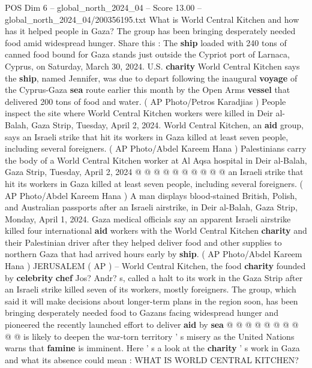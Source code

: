 \begin{textsample}{POS Dim 6 – global\_north\_2024\_04 – Score 13.00 – global\_north\_2024\_04/200356195.txt}  \label{ex:f6_pos_072}
What is World Central Kitchen and how has it helped people in Gaza?
The group has been bringing desperately needed food amid widespread hunger.
Share this : The \textbf{ship} loaded with 240 tons of canned food bound for Gaza stands just outside the Cypriot port of Larnaca, Cyprus, on Saturday, March 30, 2024.
U.S. \textbf{charity} World Central Kitchen says the \textbf{ship}, named Jennifer, was due to depart following the inaugural \textbf{voyage} of the Cyprus-Gaza \textbf{sea} route earlier this month by the Open Arms \textbf{vessel} that delivered 200 tons of food and water. ( AP Photo/Petros Karadjias ) People inspect the site where World Central Kitchen workers were killed in Deir al-Balah, Gaza Strip, Tuesday, April 2, 2024.
World Central Kitchen, an \textbf{aid} group, says an Israeli strike that hit its workers in Gaza killed at least seven people, including several foreigners. ( AP Photo/Abdel Kareem Hana ) Palestinians carry the body of a World Central Kitchen worker at Al Aqsa hospital in Deir al-Balah, Gaza Strip, Tuesday, April 2, 2024 @ @ @ @ @ @ @ @ @ @ an Israeli strike that hit its workers in Gaza killed at least seven people, including several foreigners. ( AP Photo/Abdel Kareem Hana ) A man displays blood-stained British, Polish, and Australian passports after an Israeli airstrike, in Deir al-Balah, Gaza Strip, Monday, April 1, 2024.
Gaza medical officials say an apparent Israeli airstrike killed four international \textbf{aid} workers with the World Central Kitchen \textbf{charity} and their Palestinian driver after they helped deliver food and other supplies to northern Gaza that had arrived hours early by \textbf{ship}. ( AP Photo/Abdel Kareem Hana ) JERUSALEM ( AP ) -- World Central Kitchen, the food \textbf{charity} founded by \textbf{celebrity} \textbf{chef} Jos?
Andr? s, called a halt to its work in the Gaza Strip after an Israeli strike killed seven of its workers, mostly foreigners.
The group, which said it will make decisions about longer-term plans in the region soon, has been bringing desperately needed food to Gazans facing widespread hunger and pioneered the recently launched effort to deliver \textbf{aid} by \textbf{sea} @ @ @ @ @ @ @ @ @ @ is likely to deepen the war-torn territory ' s misery as the United Nations warns that \textbf{famine} is imminent.
Here ' s a look at the \textbf{charity} ' s work in Gaza and what its absence could mean : WHAT IS WORLD CENTRAL KITCHEN?

\end{textsample}
